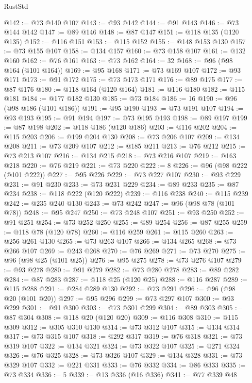 \begin{lexlean}{RustStd}
\begin{coremodule}
{\begin{coremodule}
{{{{{@142 := @73 @140 @107
@143 := @93 @142
@144 := @91 @143
@146 := @73 @144 @142
@147 := @89 @146
@148 := @87 @147
@151 := @118 @135 (@120 @135)
@152 := @116 @151
@153 := @115 @152
@155 := @148 @153 @130
@157 := @73 @155 @107
@158 := @134 @157
@160 := @73 @158 @107
@161 := @132 @160
@162 := @76 @161
@163 := @73 @162
@164 := 32
@168 := @96 (@98 @164 (@101 @164))
@169 := @95 @168
@171 := @73 @169 @107
@172 := @93 @171
@173 := @91 @172
@175 := @73 @173 @171
@176 := @89 @175
@177 := @87 @176
@180 := @118 @164 (@120 @164)
@181 := @116 @180
@182 := @115 @181
@184 := @177 @182 @130
@185 := @73 @184
@186 := 16
@190 := @96 (@98 @186 (@101 @186))
@191 := @95 @190
@193 := @73 @191 @107
@194 := @93 @193
@195 := @91 @194
@197 := @73 @195 @193
@198 := @89 @197
@199 := @87 @198
@202 := @118 @186 (@120 @186)
@203 := @116 @202
@204 := @115 @203
@206 := @199 @204 @130
@208 := @73 @206 @107
@209 := @134 @208
@211 := @73 @209 @107
@212 := @185 @211
@213 := @76 @212
@215 := @73 @213 @107
@216 := @134 @215
@218 := @73 @216 @107
@219 := @163 @218
@220 := @76 @219
@221 := @73 @220
@222 := 8
@226 := @96 (@98 @222 (@101 @222))
@227 := @95 @226
@229 := @73 @227 @107
@230 := @93 @229
@231 := @91 @230
@233 := @73 @231 @229
@234 := @89 @233
@235 := @87 @234
@238 := @118 @222 (@120 @222)
@239 := @116 @238
@240 := @115 @239
@242 := @235 @240 @130
@243 := @73 @242
@247 := @96 (@98 @78 (@101 @78))
@248 := @95 @247
@250 := @73 @248 @107
@251 := @93 @250
@252 := @91 @251
@254 := @73 @252 @250
@255 := @89 @254
@256 := @87 @255
@259 := @118 @78 (@120 @78)
@260 := @116 @259
@261 := @115 @260
@263 := @256 @261 @130
@265 := @73 @263 @107
@266 := @134 @265
@268 := @73 @266 @107
@269 := @243 @268
@270 := @76 @269
@271 := @73 @270
@275 := @96 (@98 @25 (@101 @25))
@276 := @95 @275
@278 := @73 @276 @107
@279 := @93 @278
@280 := @91 @279
@282 := @73 @280 @278
@283 := @89 @282
@284 := @87 @283
@287 := @118 @25 (@120 @25)
@288 := @116 @287
@289 := @115 @288
@291 := @284 @289 @130
@292 := @73 @291
@296 := @96 (@98 @20 (@101 @20))
@297 := @95 @296
@299 := @73 @297 @107
@300 := @93 @299
@301 := @91 @300
@303 := @73 @301 @299
@304 := @89 @303
@305 := @87 @304
@308 := @118 @20 (@120 @20)
@309 := @116 @308
@310 := @115 @309
@312 := @305 @310 @130
@314 := @73 @312 @107
@315 := @134 @314
@317 := @73 @315 @107
@318 := @292 @317
@319 := @76 @318
@321 := @73 @319 @107
@322 := @134 @321
@324 := @73 @322 @107
@325 := @271 @324
@326 := @76 @325
@328 := @73 @326 @107
@329 := @134 @328
@331 := @73 @329 @107
@332 := @221 @331
@333 := @76 @332
@334 := @86 @333
@335 := @73 @334
@336 := 5
@339 := @13 @336 (@16 @336)
@341 := @77 @339 @48
}}}}}
\end{coremodule}}
\end{coremodule}
\end{lexlean}
